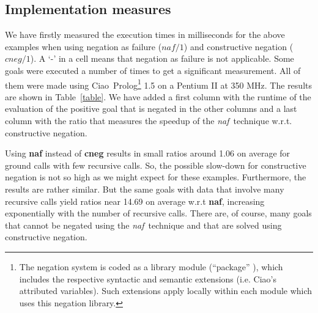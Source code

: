 \documentclass{tlp}
\newcommand{\naf}{{\em naf}}\newcommand{\viejo}[1]{}
\newcommand{\ciao}{Ciao}
\begin{document}




\subsection{Implementation measures}

We have firstly measured the execution times in milliseconds for the
above examples when using negation as failure ($naf/1$) and
constructive negation ($cneg/1$). A `-' in a cell means that negation
as failure is not applicable. Some goals were executed a number of
times to get a significant measurement. All of them were made using
\ciao\ Prolog\footnote{The negation system is coded as a library
module (``package'' \cite{ciao-modules-cl2000}), which includes the
respective syntactic and semantic extensions (i.e. Ciao's attributed
variables). Such extensions apply locally within each module which
uses this negation library.} 1.5 on a Pentium II at 350 MHz. The
results are shown in Table~\ref{table}. We have added a first column
with the runtime of the evaluation of the positive goal that is
negated in the other columns and a last column with the ratio that
measures the speedup of the \naf\ technique w.r.t. constructive
negation.

Using {\bf naf} instead of {\bf cneg} results in small ratios around
1.06 on average for ground calls with few recursive calls. So, the
possible slow-down for constructive negation is not so high as we
might expect for these examples. Furthermore, the results are rather
similar. But the same goals with data that involve many recursive
calls yield ratios near 14.69 on average w.r.t {\bf naf},
increasing exponentially with the number of recursive calls. There
are, of course, many goals that cannot be negated using the \naf\
technique and that are solved using constructive negation.

 

\end{document}
